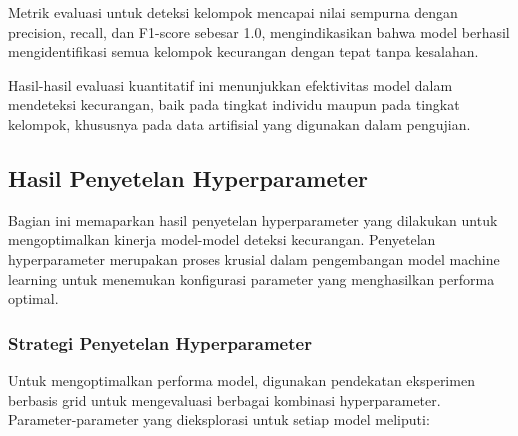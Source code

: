 Metrik evaluasi untuk deteksi kelompok mencapai nilai sempurna dengan precision, recall, dan F1-score sebesar 1.0, mengindikasikan bahwa model berhasil mengidentifikasi semua kelompok kecurangan dengan tepat tanpa kesalahan.

Hasil-hasil evaluasi kuantitatif ini menunjukkan efektivitas model dalam mendeteksi kecurangan, baik pada tingkat individu maupun pada tingkat kelompok, khususnya pada data artifisial yang digunakan dalam pengujian.

\subsection{Hasil Penyetelan Hyperparameter}
\label{subsec:hasilPenyetelanHyperparameter}

Bagian ini memaparkan hasil penyetelan hyperparameter yang dilakukan untuk mengoptimalkan kinerja model-model deteksi kecurangan. Penyetelan hyperparameter merupakan proses krusial dalam pengembangan model machine learning untuk menemukan konfigurasi parameter yang menghasilkan performa optimal.

\subsubsection{Strategi Penyetelan Hyperparameter}

Untuk mengoptimalkan performa model, digunakan pendekatan eksperimen berbasis grid untuk mengevaluasi berbagai kombinasi hyperparameter. Parameter-parameter yang dieksplorasi untuk setiap model meliputi:

